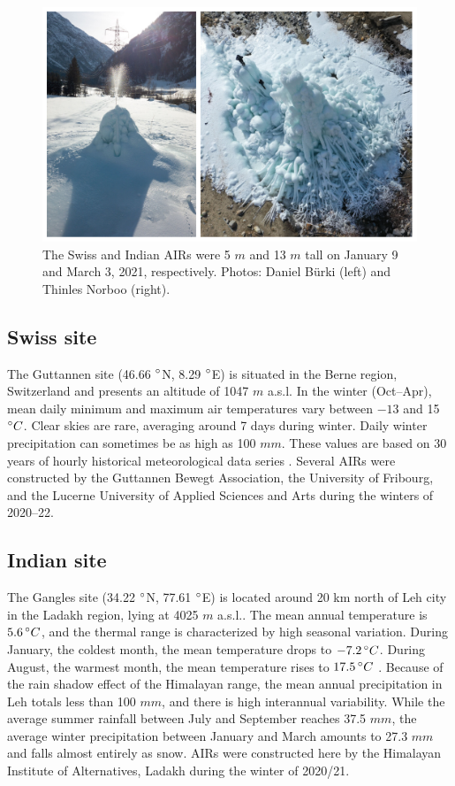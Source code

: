 \begin{figure}[htb]
	\centering
	\includegraphics[width=12 cm]{figs/2AIRs.jpg}
	\caption{The Swiss and Indian \ac{AIRs} were 5 $m$ and 13 $m$ tall on January 9 and March 3, 2021,
    respectively. Photos: Daniel Bürki (left) and Thinles Norboo (right).}
	\label{fig:2AIRs}
\end{figure}

\subsection{Swiss site}

The Guttannen site (46.66 $^{\circ}$N, 8.29 $^{\circ}$E) is situated in the Berne region, Switzerland and presents an
altitude of 1047 $m$ a.s.l. In the winter (Oct–Apr), mean daily minimum and maximum air temperatures vary
between $-13$ and 15 $^{\circ} C$. Clear skies are rare, averaging around 7 days during winter. Daily winter
precipitation can sometimes be as high as 100 $mm$. These values are based on 30 years of hourly historical
meteorological data series \citep{meteoblueClimateGuttannen2021}. Several \ac{AIRs} were constructed by the Guttannen
Bewegt Association, the University of Fribourg, and the Lucerne University of Applied Sciences and Arts during
the winters of 2020–22.

\subsection{Indian site}

The Gangles site (34.22 $^{\circ}$N, 77.61 $^{\circ}$E) is located around 20 km north of Leh city in the Ladakh
region, lying at 4025 $m$ a.s.l.. The mean annual temperature is $5.6 \, ^{\circ} C$, and the thermal range is
characterized by high seasonal variation. During January, the coldest month, the mean temperature drops to $-7.2
	\, ^{\circ} C$. During August, the warmest month, the mean temperature rises to $17.5 \, ^{\circ} C$
\citep{nusserIrrigationDevelopmentUpper2012}. Because of the rain shadow effect of the Himalayan range, the mean
annual precipitation in Leh totals less than 100 $mm$, and there is high interannual variability. While the
average summer rainfall between July and September reaches 37.5 $mm$, the average winter precipitation between
January and March amounts to 27.3 $ mm$ and falls almost entirely as snow. \ac{AIRs} were constructed here by the
Himalayan Institute of Alternatives, Ladakh during the winter of 2020/21.

